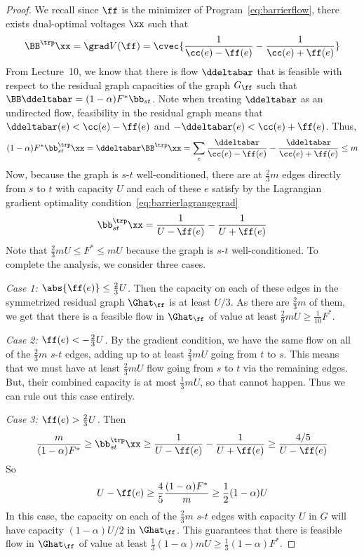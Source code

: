 \begin{proof}
  We recall since $\ff$ is the minimizer of
  Program~\eqref{eq:barrierflow}, there exists dual-optimal voltages
  $\xx$ such that
  \[
    \BB^{\trp} \xx = \grad V(\ff) =
    \cvec{\frac{1}
    {\cc(e)-\ff(e)}
    -
    \frac{1}
    {\cc(e)+\ff(e)}}
  \]
From Lecture~10, we know that there is flow $\ddeltabar$ that is feasible with
respect to the residual graph capacities of the graph $G_{\ff}$ such
that $\BB \ddeltabar = (1-\alpha)F^* \bb_{st}$.
Note when treating $\ddeltabar$ as an undirected
flow, feasibility in the residual graph means that $\ddeltabar(e) < \cc(e)-\ff(e)$
and $-\ddeltabar(e) < \cc(e)+\ff(e)$.
Thus,
\[
  (1-\alpha)F^* \bb_{st}^{\trp}
  \xx
  =
  \ddeltabar 
  \BB^{\trp} \xx
  =
  \sum_e
  \frac{\ddeltabar}
    {\cc(e)-\ff(e)}
    -
    \frac{\ddeltabar}
    {\cc(e)+\ff(e)}
    \leq
    m
  \]
  Now, because the graph is $s$-$t$ well-conditioned,
  there are at $\frac{2}{3} m $ edges directly from $s$ to $t$ with capacity $U$
  and each of these $e$
 satisfy by the Lagrangian gradient optimality condition~\eqref{eq:barrierlagrangegrad}
 \[
   \bb_{st}^{\trp}
  \xx
   =
  \frac{1}
    {U-\ff(e)}
    -
    \frac{1}
    {U+\ff(e)}
  \]
Note that $\frac{2}{3} mU \leq F^* \leq mU$ because the graph is $s$-$t$
well-conditioned.
To complete the analysis, we consider three cases.

\emph{Case 1: $\abs{\ff(e)} \leq \frac{2}{3} U$.}
Then the capacity on each of these edges in the symmetrized residual
graph $\Ghat_{\ff}$ is at least $U/3$.
As there are $\frac{2}{3} m $ of them,
we get that there is a feasible flow in $\Ghat_{\ff}$ of value at least
$\frac{2}{9} mU\geq \frac{1}{10} F^*$. 

\emph{Case 2: $\ff(e) < -\frac{2}{3} U$.}
By the gradient condition, we have the same flow on all of the $\frac{2}{3} m$
$s$-$t$ edges, adding  up to at least $\frac{2}{3} mU$ going from $t$ to $s$.
This means that we must have at least $\frac{2}{3} mU$ flow going from
$s$ to $t$ via the remaining edges. But, their combined capacity is at
most $\frac{1}{3} mU$, so that cannot happen. Thus we can rule out
this case entirely.

\emph{Case 3: $\ff(e) > \frac{2}{3} U$.}
Then 
\[
  \frac{m}{(1-\alpha)F^* }
  \geq
     \bb_{st}^{\trp}
     \xx
 \geq
  \frac{1}
    {U-\ff(e)}
    -
    \frac{1}
    {U+\ff(e)}
 \geq
   \frac{4/5}
    {U-\ff(e)}
  \]
So
\[
  U-\ff(e) \geq \frac{4}{5}  \frac{(1-\alpha)F^* }{m}
  \geq \frac{1}{2}
(1-\alpha) U
\]
In this case, the capacity on each of the $\frac{2}{3} m$ 
$s$-$t$ edges with capacity $U$ in $G$ will
have capacity $(1-\alpha) U/2$ in $\Ghat_{\ff}$.
This guarantees that there is feasible flow in $\Ghat_{\ff}$ of value
at least $\frac{1}{3} (1-\alpha) mU \geq \frac{1}{3} (1-\alpha) F^*$.
\end{proof}
